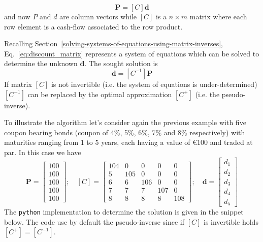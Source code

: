 \begin{equation}
\boldsymbol{P} = [C]\boldsymbol{d}
\label{eq:discount_matrix}
\end{equation}
and now $P$ and $d$ are column vectors while $[C]$ is a $n \times m$ matrix where each row element is a cash-flow associated to the row product.

Recalling Section~\ref{solving-systems-of-equations-using-matrix-inverses}, Eq.~\ref{eq:discount_matrix} represents a system of equations which can be solved to determine the unknown $\boldsymbol{d}$.
The sought solution is 
\begin{equation}
\boldsymbol{d} = [C^{-1}] \boldsymbol{P}
\end{equation} 
If matrix $[C]$ is not invertible (i.e. the system of equations is under-determined) $[C^{-1}]$ can be replaced by the optimal approximation $[C^+]$ (i.e. the pseudo-inverse). 

To illustrate the algorithm let's consider again the previous example with five coupon bearing bonds (coupon of 4\%, 5\%, 6\%, 7\% and 8\% respectively) with maturities ranging from 1 to 5 years, each having a value of \euro{100} and traded at par. In this case we have
\begin{equation*}
\boldsymbol{P} = 
\begin{bmatrix}
100 \\
100 \\
100 \\
100 \\
100 
\end{bmatrix}; \quad
[C] = 
\begin{bmatrix}
104 & 0 & 0 & 0 & 0 \\
5 & 105 & 0 & 0 & 0 \\
6 & 6 & 106 & 0 & 0 \\
7 & 7 & 7 & 107 & 0 \\
8 & 8 & 8 & 8 & 108
\end{bmatrix}; \quad \boldsymbol{d} =
\begin{bmatrix}
d_1 \\
d_2 \\
d_3 \\
d_4 \\
d_5 
\end{bmatrix}
\end{equation*}
The \texttt{python} implementation to determine the solution is given in the snippet below. The code use by default the pseudo-inverse since if $[C]$ is invertible holds $[C^+] = [C^{-1}]$. 

